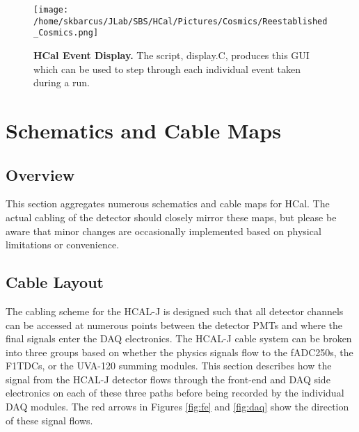 \documentclass[oneside]{book}   %
\newcommand{\hcal}{HCAL-J\xspace}
\begin{document}
 	\begin{figure}[!ht]
	\begin{center}
	\texttt{[image: /home/skbarcus/JLab/SBS/HCal/Pictures/Cosmics/Reestablished\_Cosmics.png]}
	\end{center}
	\caption{
	{\bf{HCal Event Display.}} The script, display.C, produces this GUI which can be used to step through each individual event taken during a run.}
	\label{fig:event_display}
	\end{figure}

\chapter{Schematics and Cable Maps}
\label{ch:schematics}

\section{Overview}
\label{sec:schematics_overview}

This section aggregates numerous schematics and cable maps for HCal. The actual cabling of the detector should closely mirror these maps, but please be aware that minor changes are occasionally implemented based on physical limitations or convenience.

\section{Cable Layout}
\label{sec:cable_layout}

The cabling scheme for the \hcal is designed such that all detector channels can be accessed at numerous points between the detector PMTs and where the final signals enter the DAQ electronics. The \hcal cable system can be broken into three groups based on whether the physics signals flow to the fADC250s, the F1TDCs, or the UVA-120 summing modules. This section describes how the signal from the \hcal detector flows through the front-end and DAQ side electronics on each of these three paths before being recorded by the individual DAQ modules. The red arrows in Figures \ref{fig:fe} and \ref{fig:daq} show the direction of these signal flows.\\ %
\end{document}
